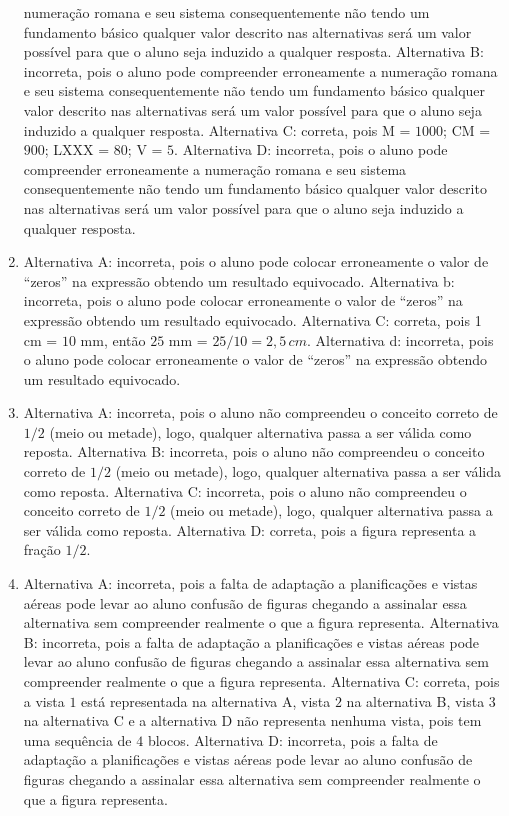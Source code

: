 \begin{enumerate}
numeração romana e seu sistema consequentemente não tendo um fundamento
básico qualquer valor descrito nas alternativas será um valor possível
para que o aluno seja induzido a qualquer resposta.
Alternativa B: incorreta, pois o aluno pode compreender erroneamente a
numeração romana e seu sistema consequentemente não tendo um fundamento
básico qualquer valor descrito nas alternativas será um valor possível
para que o aluno seja induzido a qualquer resposta.
Alternativa C: correta, pois M = $1000$; CM = $900$; LXXX = $80$; V = $5$.
Alternativa D: incorreta, pois o aluno pode compreender erroneamente a
numeração romana e seu sistema consequentemente não tendo um fundamento
básico qualquer valor descrito nas alternativas será um valor possível
para que o aluno seja induzido a qualquer resposta.
\item Alternativa A: incorreta, pois o aluno pode colocar erroneamente o valor
de ``zeros'' na expressão obtendo um resultado equivocado.
Alternativa b: incorreta, pois o aluno pode colocar erroneamente o valor
de ``zeros'' na expressão obtendo um resultado equivocado.
Alternativa C: correta, pois 1 cm = $10$ mm, então $25$ mm = $25 / 10 = 2,5\,cm$.
Alternativa d: incorreta, pois o aluno pode colocar erroneamente o valor
de ``zeros'' na expressão obtendo um resultado equivocado.
\item Alternativa A: incorreta, pois o aluno não compreendeu o conceito
correto de $1/2$ (meio ou metade), logo, qualquer alternativa passa a ser
válida como reposta.
Alternativa B: incorreta, pois o aluno não compreendeu o conceito
correto de $1/2$ (meio ou metade), logo, qualquer alternativa passa a ser
válida como reposta.
Alternativa C: incorreta, pois o aluno não compreendeu o conceito
correto de $1/2$ (meio ou metade), logo, qualquer alternativa passa a ser
válida como reposta.
Alternativa D: correta, pois a figura representa a fração $1/2$.
\item Alternativa A: incorreta, pois a falta de adaptação a planificações e
vistas aéreas pode levar ao aluno confusão de figuras chegando a
assinalar essa alternativa sem compreender realmente o que a figura
representa.
Alternativa B: incorreta, pois a falta de adaptação a planificações e
vistas aéreas pode levar ao aluno confusão de figuras chegando a
assinalar essa alternativa sem compreender realmente o que a figura
representa.
Alternativa C: correta, pois a vista $1$ está representada na alternativa
A, vista $2$ na alternativa B, vista $3$ na alternativa C e a alternativa D
não representa nenhuma vista, pois tem uma sequência de $4$ blocos.
Alternativa D: incorreta, pois a falta de adaptação a planificações e
vistas aéreas pode levar ao aluno confusão de figuras chegando a
assinalar essa alternativa sem compreender realmente o que a figura
representa.
\end{enumerate}

